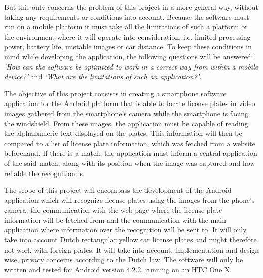 But this only concerns the problem of this project in a more general way, without taking any requirements or conditions into account. Because the software must run on a mobile platform it must take all the limitations of such a platform or the environment where it will operate into consideration, i.e. limited processing power, battery life, unstable images or car distance. To keep these conditions in mind while developing the application, the following questions will be answered: \textit{`How can the software be optimized to work in a correct way from within a mobile device?'} and \textit{`What are the limitations of such an application?'}.


The objective of this project consists in creating a smartphone software application for the Android platform that is able to locate license plates in video images gathered from the smartphone's camera while the smartphone is facing the windshield. From these images, the application must be capable of reading the alphanumeric text displayed on the plates. This information will then be compared to a list of license plate information, which was fetched from a website beforehand. If there is a match, the application must inform a central application of the said match, along with its position when the image was captured and how reliable the recognition is.


The scope of this project will encompass the development of the Android application which will recognize license plates using the images from the phone's camera, the communication with the web page where the license plate information will be fetched from and the communication with the main application where information over the recognition will be sent to. It will only take into account Dutch rectangular yellow car license plates and might therefore not work with foreign plates. It will take into account, implementation and design wise, privacy concerns according to the Dutch law. The software will only be written and tested for Android version 4.2.2, running on an HTC One X.
